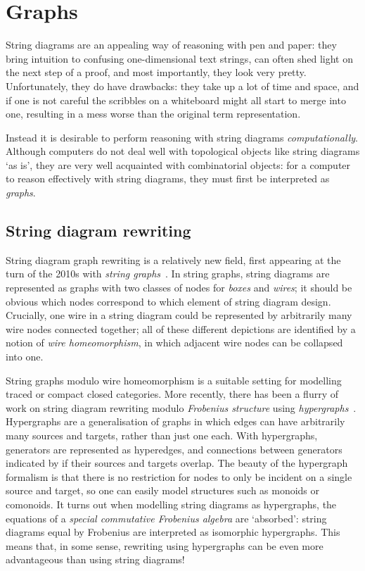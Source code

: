 \chapter{Graphs}

String diagrams are an appealing way of reasoning with pen and paper: they bring
intuition to confusing one-dimensional text strings, can often shed light on the
next step of a proof, and most importantly, they look very pretty.
Unfortunately, they do have drawbacks: they take up a lot of time and space, and
if one is not careful the scribbles on a whiteboard might all start to merge
into one, resulting in a mess worse than the original term representation.

Instead it is desirable to perform reasoning with string diagrams
\emph{computationally}.
Although computers do not deal well with topological objects like string
diagrams `as is', they are very well acquainted with combinatorial objects: for
a computer to reason effectively with string diagrams, they must first be
interpreted as \emph{graphs}.

\section{String diagram rewriting}

String diagram graph rewriting is a relatively new field, first appearing at the
turn of the 2010s with \emph{string graphs}~\cite{%
    dixon2010open,dixon2013opengraphs,kissinger2012pictures%
}.
In string graphs, string diagrams are represented as graphs with two classes of
nodes for \emph{boxes} and \emph{wires}; it should be obvious which nodes
correspond to which element of string diagram design.
Crucially, one wire in a string diagram could be represented by arbitrarily
many wire nodes connected together; all of these different depictions are
identified by a notion of \emph{wire homeomorphism}, in which adjacent wire
nodes can be collapsed into one.


String graphs modulo wire homeomorphism is a suitable setting for modelling
traced or compact closed categories.
More recently, there has been a flurry of work on string diagram rewriting
modulo \emph{Frobenius structure} using \emph{hypergraphs}~\cite{%
    bonchi2016rewriting,zanasi2017rewriting,bonchi2017confluence,%
    bonchi2018rewriting,bonchi2022string,bonchi2022stringa,bonchi2022stringb%
}.
Hypergraphs are a generalisation of graphs in which edges can have arbitrarily
many sources and targets, rather than just one each.
With hypergraphs, generators are represented as hyperedges, and connections
between generators indicated by if their sources and targets overlap.
The beauty of the hypergraph formalism is that there is no restriction for
nodes to only be incident on a single source and target, so one can easily
model structures such as monoids or comonoids.
It turns out when modelling string diagrams as hypergraphs, the equations of
a \emph{special commutative Frobenius algebra} are `absorbed': string diagrams
equal by Frobenius are interpreted as isomorphic hypergraphs.
This means that, in some sense, rewriting using hypergraphs can be even more
advantageous than using string diagrams!

